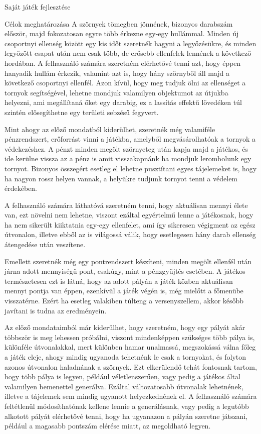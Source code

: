\begin{MyChapter}{Saját játék fejlesztése}
\begin{MySection}{Célok meghatározása}
		A szörnyek tömegben jönnének, bizonyos darabszám először, majd fokozatosan egyre több érkezne egy-egy hullámmal. Minden új csoportnyi ellenség között egy kis időt szeretnék hagyni a legyőzésükre, és minden legyőzött csapat után nem csak több, de erősebb ellenfelek lennének a következő hordában. A felhasználó számára szeretném elérhetővé tenni azt, hogy éppen hanyadik hullám érkezik, valamint azt is, hogy hány szörnyből áll majd a következő csoportnyi ellenfél.
		Azon kívül, hogy meg tudjuk ölni az ellenséget a tornyok segítségével, lehetne mondjuk valamilyen objektumot az útjukba helyezni, ami megállítaná őket egy darabig, ez a lassítás effektű lövedéken túl szintén elősegíthetne egy területi sebzésű fegyvert.
		
		Mint ahogy az előző mondatból kiderülhet, szeretnék még valamiféle pénzrendszert, erőforrást vinni a játékba, amelyből megvásárolhatóak a tornyok a védekezéshez. A pénzt minden megölt szörnyeteg után kapja majd a játékos, és ide kerülne vissza az a pénz is amit visszakapnánk ha mondjuk lerombolunk egy tornyot. Bizonyos összegért esetleg el lehetne pusztítani egyes tájelemeket is, hogy ha nagyon rossz helyen vannak, a helyükre tudjunk tornyot tenni a védelem érdekében.
		
		A felhasználó számára láthatóvá szeretném tenni, hogy aktuálisan mennyi élete van, ezt növelni nem lehetne, viszont ezáltal egyértelmű lenne a játékosnak, hogy ha nem sikerült kiiktatnia egy-egy ellenfelet, ami így sikeresen végigment az egész útvonalon, illetve ebből az is világossá válik, hogy esetlegesen hány darab ellenség átengedése után veszítene.
		
		Emellett szeretnék még egy pontrendszert készíteni, minden megölt ellenfél után járna adott mennyiségű pont, csakúgy, mint a pénzgyűjtés esetében. A játékos természetesen ezt is látná, hogy az adott pályán a játék közben aktuálisan mennyi pontja van éppen, ezenkívül a játék végén is, még mielőtt a főmenübe visszatérne. Ezért ha esetleg valakiben túlteng a versenyszellem, akkor később javítani is tudna az eredményein.
		
		Az előző mondataimból már kiderülhet, hogy szeretném, hogy egy pályát akár többször is meg lehessen próbálni, viszont mindenképpen szükséges több pálya is, különféle útvonalakkal, mert különben hamar unalmassá, megszokássá válna főleg a játék eleje, ahogy mindig ugyanoda tehetnénk le csak a tornyokat, és folyton azonos útvonalon haladnának a szörnyek. Ezt elkerülendő tehát fontosnak tartom, hogy több pálya is legyen, például véletlenszerűen, vagy pedig a játékos által valamilyen bemenettel generálva. Ezáltal változatosabb útvonalak lehetnének, illetve a tájelemek sem mindig ugyanott helyezkednének el. A felhasználó számára feltétlenül módosíthatónak kellene lennie a generálásnak, vagy pedig a legutóbb alkotott pályát elérhetővé tenni, hogy ha ugyanazon a pályán szeretne játszani, például a magasabb pontszám elérése miatt, az megoldható legyen.
		

\end{MySection}
\end{MyChapter}
